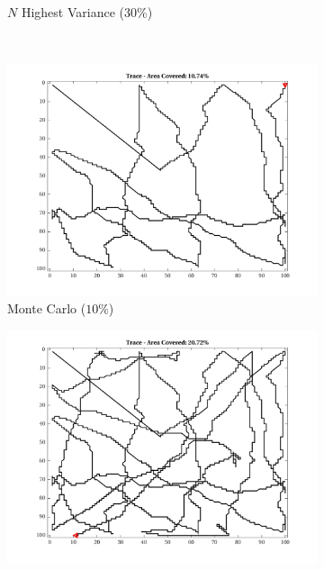 \begin{figure}[htb!]
\begin{subfigure}[t]{0.32\textwidth}
        \ssp
        \captionsetup{skip=0.20\baselineskip,size=footnotesize}
        \caption{$N$ Highest Variance ($30\%$)}
    \end{subfigure}%
    \\
    \begin{subfigure}[t]{0.32\textwidth}
        \centering
        \includegraphics[width=\linewidth]{figures/hbresults/path_mc_10p_100x100_sf_100_seed_2.png}
        \ssp
        \captionsetup{skip=0.20\baselineskip,size=footnotesize}
        \caption{Monte Carlo ($10\%$)}
    \end{subfigure}%
    \begin{subfigure}[t]{0.32\textwidth}
        \centering
        \includegraphics[width=\linewidth]{figures/hbresults/path_mc_20p_100x100_sf_100_seed_2.png}

\end{subfigure}
\end{figure}

